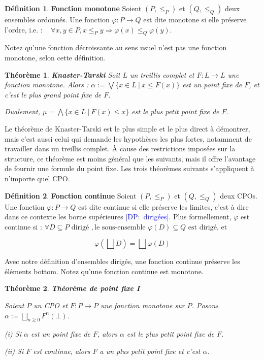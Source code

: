 \documentclass{article}
\newcommand\dam[1]{\textcolor{blue}{{[DP:~#1]}}}
\newtheorem{theorem}{Théorème}[section]
\theoremstyle{definition}
\newtheorem{definition}{Définition}[section]
\begin{document}
\begin{definition}{\textbf{Fonction monotone}}
Soient $(P, \leq_P)$ et $(Q, \leq_Q)$ deux ensembles ordonnés. Une fonction $\varphi : P \rightarrow Q$ est dite monotone si elle préserve l'ordre, i.e. : ~ $\forall x, y \in P, x \leq_P y \Longrightarrow \varphi(x) \leq_Q \varphi(y)$.

Notez qu'une fonction décroissante au sens usuel n'est pas une fonction monotone, selon cette définition.
\end{definition}

\begin{theorem}{\textbf{Knaster-Tarski}}
Soit $L$ un treillis complet et $F : L \rightarrow L$ une fonction monotone. Alors :
$ \alpha := \bigvee \{x \in L ~|~ x \leq F(x)\}$
est un point fixe de $F$, et c'est le plus grand point fixe de $F$.

\noindent Dualement, $\mu = \bigwedge \{x \in L ~|~ F(x) \leq x\}$ est le plus petit point fixe de $F$.
\end{theorem}

Le théorème de Knaster-Tarski est le plus simple et le plus direct à démontrer, mais c'est aussi celui qui demande les hypothèses les plus fortes, notamment de travailler dans un treillis complet. À cause des restrictions imposées sur la structure, ce théorème est moins général que les suivants, mais il offre l'avantage de fournir une formule du point fixe. Les trois théorèmes suivants s'appliquent à n'importe quel CPO.

\begin{definition}{\textbf{Fonction continue}}
Soient $(P, \leq_P)$ et $(Q, \leq_Q)$ deux CPOs. Une fonction $\varphi : P \rightarrow Q$ est dite continue si elle préserve les limites, c'est à dire dans ce contexte les borne supérieures \dam{dirigées}. Plus formellement, $\varphi$ est continue si :
$\forall D \subseteq P \text{ dirigé }, \text{le sous-ensemble } \varphi(D) \subseteq Q \text{ est dirigé, et }$

$$ \varphi(\bigsqcup D) = \bigsqcup \varphi(D) $$ 

Avec notre définition d'ensembles dirigés, une fonction continue préserve les éléments bottom.
Notez qu'une fonction continue est monotone.
\end{definition}

\begin{theorem}{\textbf{Théorème de point fixe I}}

Soient $P$ un CPO et $F : P \rightarrow P$ une fonction monotone sur $P$. Posons $\alpha := \bigsqcup_{n \geq 0}F^n(\bot)$.

(i) Si $\alpha$ est un point fixe de $F$, alors $\alpha$ est le plus petit point fixe de $F$.

(ii) Si $F$ est continue, alors $F$ a un plus petit point fixe et c'est $\alpha$.

\end{theorem}
\end{document}

